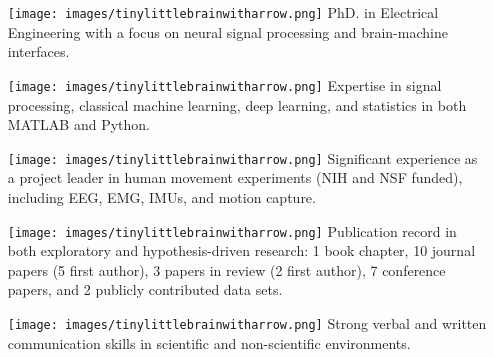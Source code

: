    \begin{adjustwidth}{0.5em}{0pt}
    \begin{itemize}
        \item[\texttt{[image: images/tinylittlebrainwitharrow.png]}] PhD. in Electrical Engineering with a focus on neural signal processing and brain-machine interfaces.
        \item[\texttt{[image: images/tinylittlebrainwitharrow.png]}] Expertise in signal processing, classical machine learning, deep learning, and statistics in both MATLAB and Python.
        \item[\texttt{[image: images/tinylittlebrainwitharrow.png]}] Significant experience as a project leader in human movement experiments (NIH and NSF funded), including EEG, EMG, IMUs, and motion capture. 
        \item[\texttt{[image: images/tinylittlebrainwitharrow.png]}] Publication record in both exploratory and hypothesis-driven research: 1 book chapter, 10 journal papers (5 first author), 3 papers in review (2 first author), 7 conference papers, and 2 publicly contributed data sets.
        \item[\texttt{[image: images/tinylittlebrainwitharrow.png]}] Strong verbal and written communication skills in scientific and non-scientific environments.
    \end{itemize}
    \end{adjustwidth}